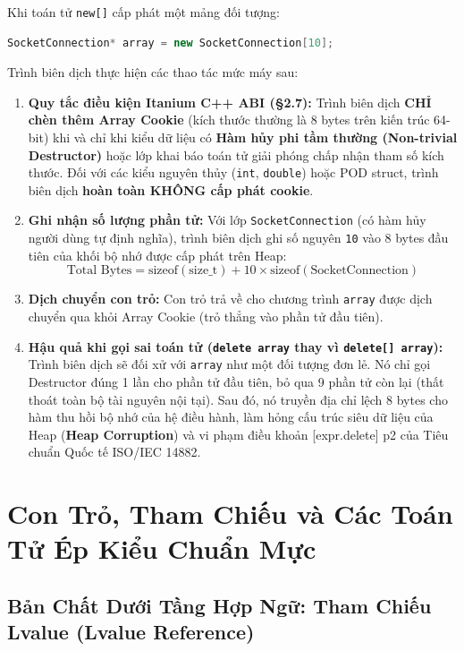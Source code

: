\documentclass[12pt,a4paper,oneside]{book}
\begin{document}
\begin{underhoodbox}
Khi toán tử \texttt{new[]} cấp phát một mảng đối tượng:
\begin{lstlisting}[language=C++]
SocketConnection* array = new SocketConnection[10];
\end{lstlisting}

Trình biên dịch thực hiện các thao tác mức máy sau:
\begin{enumerate}
    \item \textbf{Quy tắc điều kiện Itanium C++ ABI (§2.7):} Trình biên dịch \textbf{CHỈ chèn thêm Array Cookie} (kích thước thường là 8 bytes trên kiến trúc 64-bit) khi và chỉ khi kiểu dữ liệu có \textbf{Hàm hủy phi tầm thường (Non-trivial Destructor)} hoặc lớp khai báo toán tử giải phóng chấp nhận tham số kích thước. Đối với các kiểu nguyên thủy (\texttt{int}, \texttt{double}) hoặc POD struct, trình biên dịch \textbf{hoàn toàn KHÔNG cấp phát cookie}.
    \item \textbf{Ghi nhận số lượng phần tử:} Với lớp \texttt{SocketConnection} (có hàm hủy người dùng tự định nghĩa), trình biên dịch ghi số nguyên \texttt{10} vào 8 bytes đầu tiên của khối bộ nhớ được cấp phát trên Heap:
    $$\text{Total Bytes} = \text{sizeof}(\text{size\_t}) + 10 \times \text{sizeof}(\text{SocketConnection})$$
    \item \textbf{Dịch chuyển con trỏ:} Con trỏ trả về cho chương trình \texttt{array} được dịch chuyển qua khỏi Array Cookie (trỏ thẳng vào phần tử đầu tiên).
    \item \textbf{Hậu quả khi gọi sai toán tử (\texttt{delete array} thay vì \texttt{delete[] array}):}
    Trình biên dịch sẽ đối xử với \texttt{array} như một đối tượng đơn lẻ. Nó chỉ gọi Destructor đúng 1 lần cho phần tử đầu tiên, bỏ qua 9 phần tử còn lại (thất thoát toàn bộ tài nguyên nội tại). Sau đó, nó truyền địa chỉ lệch 8 bytes cho hàm thu hồi bộ nhớ của hệ điều hành, làm hỏng cấu trúc siêu dữ liệu của Heap (\textbf{Heap Corruption}) và vi phạm điều khoản [expr.delete] p2 của Tiêu chuẩn Quốc tế ISO/IEC 14882.
\end{enumerate}
\end{underhoodbox}

\section{Con Trỏ, Tham Chiếu và Các Toán Tử Ép Kiểu Chuẩn Mực}

\subsection{Bản Chất Dưới Tầng Hợp Ngữ: Tham Chiếu Lvalue (Lvalue Reference)}
\end{document}
